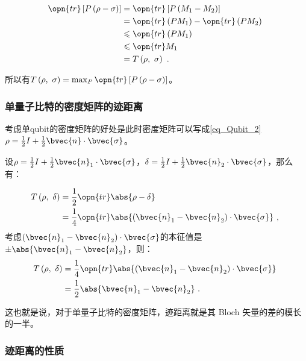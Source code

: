 \begin{equation}
\begin{aligned}
\opn{tr} \left[ P\left(\rho - \sigma\right) \right] &= \opn{tr}\left[ P\left(M_1 - M_2\right) \right] \\
&= \opn{tr}\left(PM_1\right) - \opn{tr}\left(PM_2\right) \\
&\leqslant \opn{tr}\left(PM_1\right) \\
&\leqslant \opn{tr}M_1 \\
&= T\left( \rho,~\sigma \right)~.
\end{aligned}~
\end{equation}

所以有$T\left(\rho,~\sigma\right) = \max_{ P } \opn{tr}\left[P\left(\rho - \sigma\right)\right]$。

\subsubsection{单量子比特的密度矩阵的迹距离}

考虑单qubit的密度矩阵的好处是此时密度矩阵可以写成\autoref{eq_Qubit_2} $\rho = \frac{1}{2}I + \frac{1}{2}\bvec{n}\cdot \bvec{\sigma}$。

设$\rho = \frac{1}{2}I + \frac{1}{2}\bvec{n}_1\cdot \bvec{\sigma}$，$\delta = \frac{1}{2}I + \frac{1}{2}\bvec{n}_2\cdot \bvec{\sigma}$，那么有：

\begin{equation}
\begin{aligned}
T\left(\rho,~\delta\right) &= \frac{1}{2}\opn{tr}\abs{\rho - \delta} \\
&= \frac{1}{4}\opn{tr}\abs{\left(\bvec{n}_1 - \bvec{n}_2\right) \cdot \bvec{\sigma}}~,
\end{aligned}~
\end{equation}
考虑$\left(\bvec{n}_1 - \bvec{n}_2\right) \cdot \bvec{\sigma}$的本征值是$\pm \abs{\bvec{n}_1 - \bvec{n}_2}$，则：
\begin{equation}
\begin{aligned}
T\left(\rho,~\delta\right) 
&= \frac{1}{4}\opn{tr}\abs{\left(\bvec{n}_1 - \bvec{n}_2\right) \cdot \bvec{\sigma}} \\ 
&= \frac{1}{2}\abs{\bvec{n}_1 - \bvec{n}_2}~.
\end{aligned}~
\end{equation}

这也就是说，对于单量子比特的密度矩阵，迹距离就是其 Bloch 矢量的差的模长的一半。

\subsubsection{迹距离的性质}

